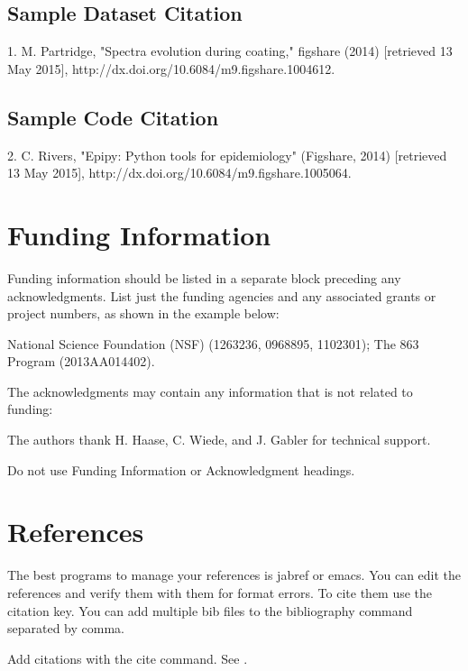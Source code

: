 \documentclass[9pt,twocolumn,twoside]{styles/osajnl}
\begin{document}
\subsection{Sample Dataset Citation}

1. M. Partridge, "Spectra evolution during coating," figshare (2014) [retrieved 13 May 2015], http://dx.doi.org/10.6084/m9.figshare.1004612.

\subsection{Sample Code Citation}

2. C. Rivers, "Epipy: Python tools for epidemiology" (Figshare, 2014) [retrieved 13 May 2015], http://dx.doi.org/10.6084/m9.figshare.1005064.

\section{Funding Information}

Funding information should be listed in a separate block preceding any acknowledgments. List just the funding agencies and any associated grants or project numbers, as shown in the example below:

National Science Foundation (NSF) (1263236, 0968895, 1102301); The 863 Program (2013AA014402).

The acknowledgments may contain any information that is not related to funding:

The authors thank H. Haase, C. Wiede, and J. Gabler for technical support.

Do not use Funding Information or Acknowledgment headings.

\section{References}

The best programs to manage your references is jabref or emacs. You can edit the references and verify them with them for format errors. To cite them use the citation key. You can add multiple bib files to the bibliography command separated by comma.

\bigskip
\noindent Add citations with the cite command. See \cite{Zhang:14,OSA,FORSTER2007}.



 
\end{document}
